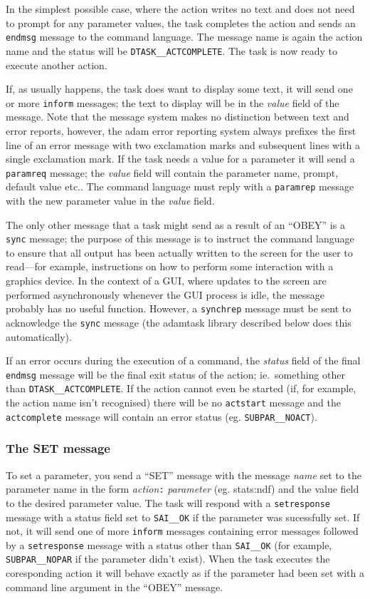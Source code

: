 In the simplest possible case, where the action writes no text and does 
not need to prompt for any parameter values, the task completes the action
and sends an {\tt endmsg} message to the command language. The message name 
is again the action name
and the status will be {\tt DTASK\_\_ACTCOMPLETE}. The task is now ready to 
execute another action.

If, as usually happens, the task does want to display some text, it will send
one or more {\tt inform} messages; the text to display will be in the {\em
value} field of the message. Note that the message system makes no distinction
between text and error reports, however, the adam error reporting system 
always prefixes the first line of an error message with two exclamation marks
and subsequent lines with a single exclamation mark. If the task needs
a value for a parameter it will send a {\tt paramreq} message; the {\em value}
field will contain the parameter name, prompt, default
value etc.. The command language must reply with a {\tt paramrep} message 
with the new parameter value in the {\em value} field.

The only other message that a task might send as a result of an ``OBEY'' is
a {\tt sync} message; the purpose of this message is to instruct the command
language to ensure that all output has been actually written to the screen 
for the user to read---for example, instructions on how to perform some
interaction with a graphics device. In the context of a GUI, where updates
to the screen are performed asynchronously whenever the GUI process is idle,
the message probably has no useful function. However, a {\tt synchrep}
message must be sent to acknowledge the {\tt sync} message (the adamtask
library described below does this automatically).

If an error occurs during the execution of a command, the {\em status} field
of the final {\tt endmsg} message will be the final exit status of the action;
ie.\ something other than {\tt DTASK\_\_ACTCOMPLETE}. If the action cannot even
be started (if, for example, the action name isn't recognised) there will be
no {\tt actstart} message and the {\tt actcomplete} message will contain an
error status (eg. {\tt SUBPAR\_\_NOACT}).

\subsubsection{The SET message}

To set a parameter, you send a ``SET'' message with the message {\em
name} set to the parameter name in the form {\em action}{\tt{:}}{\em
parameter} (eg.  stats:ndf) and the value field to the desired
parameter value. The task will respond with a {\tt setresponse} message
with a status field set to {\tt SAI\_\_OK} if the parameter was
sucessfully set.  If not, it will send one of more {\tt inform}
messages containing error messages followed by a {\tt setresponse}
message with a status other than {\tt SAI\_\_OK} (for example, {\tt
SUBPAR\_\_NOPAR} if the parameter didn't exist). When the task executes
the coresponding action it will behave exactly as if the parameter had
been set with a command line argument in the ``OBEY'' message.

